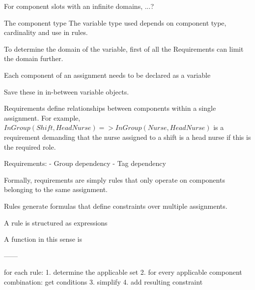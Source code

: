 For component slots with an infinite domains, ...?



The component type
The variable type used depends on component type, cardinality and use in rules.

To determine the domain of the variable, first of all the 
Requirements can limit the domain further.

Each component of an assignment needs to be declared as a variable

Save these in in-between variable objects.

Requirements define relationships between components within a single assignment.
For example, $InGroup(Shift, HeadNurse) => InGroup(Nurse, HeadNurse)$ is a requirement demanding that the nurse assigned to a shift is a head nurse if this is the required role.

Requirements:
- Group dependency
- Tag dependency

Formally, requirements are simply rules that only operate on components belonging to the same assignment.



Rules generate formulas that define constraints over multiple assignments.

A rule is structured as expressions 

A function in this sense is 

------

for each rule:
1. determine the applicable set
2. for every applicable component combination: get conditions
3. simplify
4. add resulting constraint